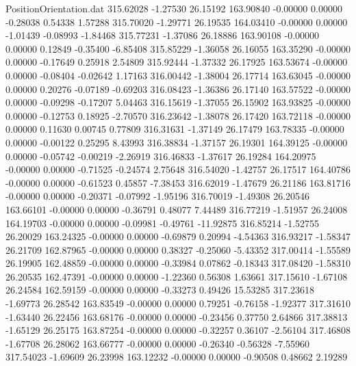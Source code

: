 \begin{filecontents}{PositionOrientation.dat}
 315.62028   -1.27530   26.15192   163.90840   -0.00000    0.00000   -0.28038    0.54338    1.57288
 315.70020   -1.29771   26.19535   164.03410   -0.00000    0.00000   -1.01439   -0.08993   -1.84468
 315.77231   -1.37086   26.18886   163.90108   -0.00000    0.00000    0.12849   -0.35400   -6.85408
 315.85229   -1.36058   26.16055   163.35290   -0.00000    0.00000   -0.17649    0.25918    2.54809
 315.92444   -1.37332   26.17925   163.53674   -0.00000    0.00000   -0.08404   -0.02642    1.17163
 316.00442   -1.38004   26.17714   163.63045   -0.00000    0.00000    0.20276   -0.07189   -0.69203
 316.08423   -1.36386   26.17140   163.57522   -0.00000    0.00000   -0.09298   -0.17207    5.04463
 316.15619   -1.37055   26.15902   163.93825   -0.00000    0.00000   -0.12753    0.18925   -2.70570
 316.23642   -1.38078   26.17420   163.72118   -0.00000    0.00000    0.11630    0.00745    0.77809
 316.31631   -1.37149   26.17479   163.78335   -0.00000    0.00000   -0.00122    0.25295    8.43993
 316.38834   -1.37157   26.19301   164.39125   -0.00000    0.00000   -0.05742   -0.00219   -2.26919
 316.46833   -1.37617   26.19284   164.20975   -0.00000    0.00000   -0.71525   -0.24574    2.75648
 316.54020   -1.42757   26.17517   164.40786   -0.00000    0.00000   -0.61523    0.45857   -7.38453
 316.62019   -1.47679   26.21186   163.81716   -0.00000    0.00000   -0.20371   -0.07992   -1.95196
 316.70019   -1.49308   26.20546   163.66101   -0.00000    0.00000   -0.36791    0.48077    7.44489
 316.77219   -1.51957   26.24008   164.19703   -0.00000    0.00000   -0.09981   -0.49761  -11.92875
 316.85214   -1.52755   26.20029   163.24325   -0.00000    0.00000   -0.69879    0.20994   -4.54363
 316.93217   -1.58347   26.21709   162.87965   -0.00000    0.00000    0.38327   -0.25060   -5.43352
 317.00414   -1.55589   26.19905   162.48859   -0.00000    0.00000   -0.33984    0.07862   -0.18343
 317.08420   -1.58310   26.20535   162.47391   -0.00000    0.00000   -1.22360    0.56308    1.63661
 317.15610   -1.67108   26.24584   162.59159   -0.00000    0.00000   -0.33273    0.49426   15.53285
 317.23618   -1.69773   26.28542   163.83549   -0.00000    0.00000    0.79251   -0.76158   -1.92377
 317.31610   -1.63440   26.22456   163.68176   -0.00000    0.00000   -0.23456    0.37750    2.64866
 317.38813   -1.65129   26.25175   163.87254   -0.00000    0.00000   -0.32257    0.36107   -2.56104
 317.46808   -1.67708   26.28062   163.66777   -0.00000    0.00000   -0.26340   -0.56328   -7.55960
 317.54023   -1.69609   26.23998   163.12232   -0.00000    0.00000   -0.90508    0.48662    2.19289

\end{filecontents}
